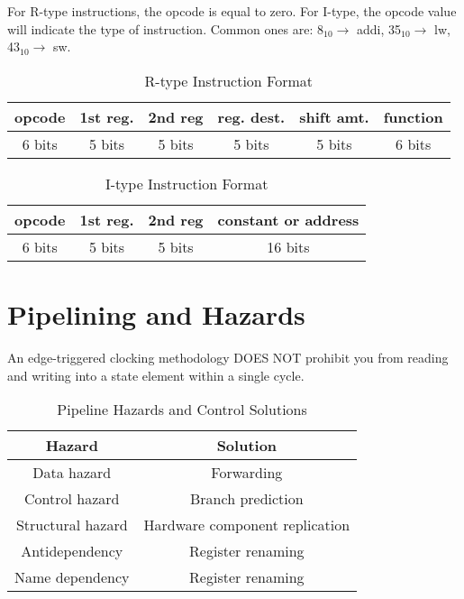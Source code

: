 \documentclass{article}
\begin{document}
For R-type instructions, the opcode is equal to zero. For I-type, the opcode value will indicate the type of instruction. Common ones are: 8$_{10} \to$ addi, 35$_{10} \to$ lw, 43$_{10} \to$ sw.

\begin{table}[ht]
\caption{R-type Instruction Format} 
\centering 
\begin{tabular}{| c | c | c | c | c | c | } 
\hline 
  opcode & 1st reg. & 2nd reg & reg. dest. & shift amt. & function\\ [0.5ex] 
\hline
6 bits & 5 bits & 5 bits & 5 bits & 5 bits & 6 bits \\

\hline
\end{tabular}
\label{table:nonlin} 
\end{table}

\begin{table}[ht]
\caption{I-type Instruction Format} 
\centering 
\begin{tabular}{| c | c | c | c | } 
\hline 
  opcode & 1st reg. & 2nd reg & constant or address\\ [0.5ex] 
\hline
6 bits & 5 bits & 5 bits & 16 bits \\

\hline
\end{tabular}
\label{table:nonlin} 
\end{table}

\section{Pipelining and Hazards}
An edge-triggered clocking methodology DOES NOT prohibit you from reading and writing into a state element within a single cycle.

\begin{table}[ht]
\caption{Pipeline Hazards and Control Solutions} 
\centering 
\begin{tabular}{| c | c |} 
\hline 
  Hazard & Solution\\ [0.5ex] 
\hline
  Data hazard & Forwarding\\
  Control hazard & Branch prediction \\
  Structural hazard & Hardware component replication \\
  Antidependency & Register renaming \\
  Name dependency & Register renaming \\

\hline
\end{tabular}
\label{table:nonlin} 
\end{table}
\end{document}
